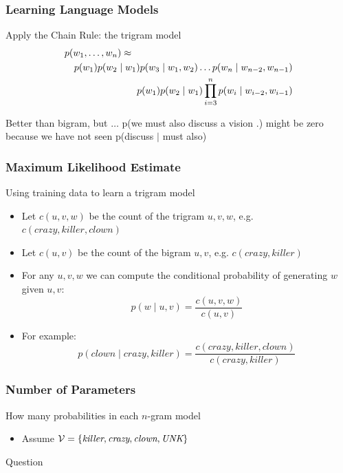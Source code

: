 \begin{frame}
\frametitle{Learning Language Models}
\begin{block}{Apply the Chain Rule: the trigram model}
\begin{eqnarray*}
\lefteqn{p(w_1, \ldots, w_n) \approx} \\
&& p(w_1) p(w_2 \mid w_1) p(w_3 \mid w_1, w_2) \ldots p(w_n \mid w_{n-2}, w_{n-1}) \\
&& p(w_1) p(w_2 \mid w_1) \prod_{i=3}^n p(w_i \mid w_{i-2}, w_{i-1})
\end{eqnarray*}
\end{block}
\pause
\begin{block}{Better than bigram, but $\ldots$}
p(\textsf{we must also discuss a vision .}) might be zero because we have not seen p(discuss $\mid$ must also)
\end{block}
\end{frame}

\begin{frame}
\frametitle{Maximum Likelihood Estimate}
\begin{block}{Using training data to learn a trigram model}
\begin{itemize}[<+->]
\item Let $c(u,v,w)$ be the count of the trigram $u,v,w$, e.g. $c(crazy,killer,clown)$
\item Let $c(u,v)$ be the count of the bigram $u,v$, e.g. $c(crazy,killer)$
\item For any $u,v,w$ we can compute the conditional probability of generating $w$ given $u,v$:
\[ p(w \mid u,v) = \frac{c(u,v,w)}{c(u,v)} \]
\item For example:
\[ p(clown \mid crazy, killer) = \frac{c(crazy, killer, clown)}{c(crazy, killer)} \]
\end{itemize}

\end{block}
\end{frame}

\begin{frame}
\frametitle{Number of Parameters}
\begin{block}{How many probabilities in each $n$-gram model}
\begin{itemize}
\item Assume ${\cal V} = \{ \textit{killer}, \textit{crazy}, \textit{clown}, \textit{UNK} \}$
\end{itemize}
\end{block}
\pause
\begin{alertblock}{Question}
\end{alertblock}
\end{frame}

